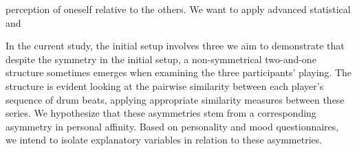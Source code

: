 \documentclass[a4paper, 11pt]{report}      %
\begin{document}
perception of oneself relative to the others. We want to apply advanced statistical and  

In the current study, the initial setup involves three we aim to demonstrate that despite the symmetry in the initial setup, a non-symmetrical two-and-one structure sometimes emerges when examining the three participants' playing. The structure is evident looking at the pairwise similarity between each player's sequence of drum beats, applying appropriate similarity measures between these series. We hypothesize that these asymmetries stem from a corresponding asymmetry in personal affinity. Based on personality and mood questionnaires, we intend to isolate explanatory variables in relation to these asymmetries.




\end{document}
